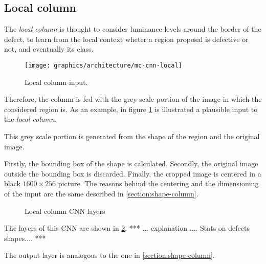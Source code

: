     \subsection{Local column}\label{section:local-column}
        \par{
            The \emph{local column} is thought to consider luminance levels around the border of the defect, to learn from the local context wheter a region proposal is defective or not, and eventually its class.
        }
        \begin{figure}
            \centering
            \texttt{[image: graphics/architecture/mc-cnn-local]}
            \caption{Local column input.}\label{fig:mc-cnn:local-input}
        \end{figure}
        \par{
            Therefore, the column is fed with the grey scale portion of the image in which the considered region is. As an example, in figure \ref{fig:mc-cnn:local-input} is illustrated a plausible input to the \emph{local column}.
        }
        \par{
            This grey scale portion is generated from the shape of the region and the original image.
        }
        \par{
            Firstly, the bounding box of the shape is calculated. Secondly, the original image outside the bounding box is discarded. Finally, the cropped image is centered in a black $1600\times 256$ picture. The reasons behind the centering and the dimensioning of the input are the same described in \ref{section:shape-column}.
        }
        \begin{figure}
            \centering
            \caption{Local column CNN layers}\label{fig:mc-cnn:local-structure}
        \end{figure}
        \par{
            The layers of this CNN are shown in \ref{fig:mc-cnn:local-structure}. *** ... explanation .... Stats on defects shapes.... ***
        }
        \par{
            The output layer is analogous to the one in \ref{section:shape-column}.
        }
